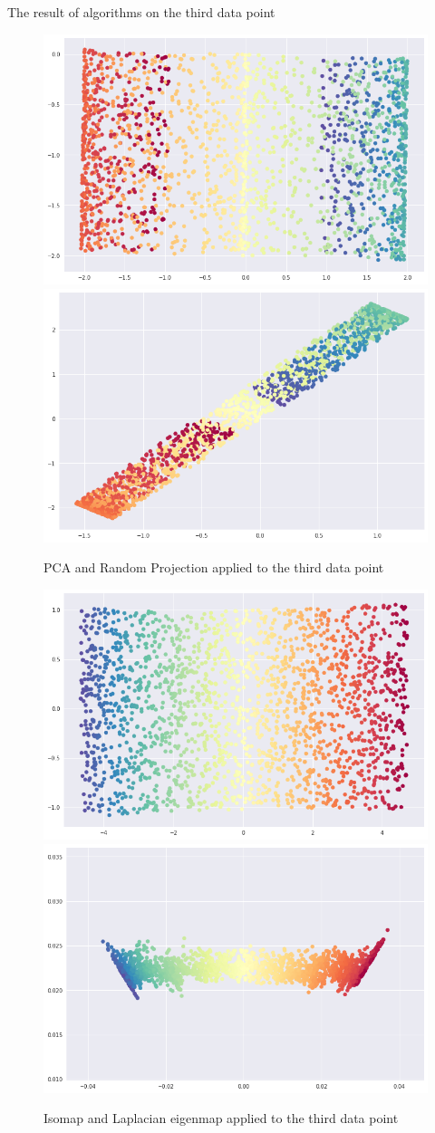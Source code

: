 \documentclass[10pt]{beamer}
\begin{document}
\begin{frame}{The result of algorithms on the third data point}
 \begin{figure}[t]
\centering
\includegraphics[width=.4\textwidth]{pca_part3.png}\hfill
\includegraphics[width=.4\textwidth]{random_projection_part3.png}
\caption{PCA and Random Projection applied to the third data point}
\end{figure}

\begin{figure}[b]
\centering
\includegraphics[width=.4\textwidth]{isomap_part3.png}\hfill
\includegraphics[width=.4\textwidth]{laplacian_part3.png}
\caption{Isomap and Laplacian eigenmap applied to the third data point}
\end{figure}

\end{frame}
\end{document}
